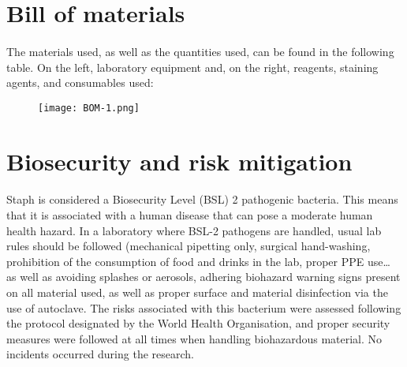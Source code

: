 \section{Bill of materials}
\paragraph{}The materials used, as well as the quantities used, can be found in the following table. On the left, laboratory equipment and, on the right, reagents, staining agents, and consumables used:
\begin{center}\begin{figure}[H]\centering\texttt{[image: BOM-1.png]}\end{figure}\end{center}
\section{Biosecurity and risk mitigation}
\paragraph{}Staph is considered a Biosecurity Level (BSL) 2 pathogenic bacteria\cite{cheungPathogenicityVirulenceStaphylococcus2021}. This means that it is associated with a human disease that can pose a moderate human health hazard. In a laboratory where BSL-2 pathogens are handled, usual lab rules should be followed (mechanical pipetting only, surgical hand-washing, prohibition of the consumption of food and drinks in the lab, proper PPE use… as well as avoiding splashes or aerosols, adhering biohazard warning signs present on all material used, as well as proper surface and material disinfection via the use of autoclave.\newline
The risks associated with this bacterium were assessed following the protocol designated by the World Health Organisation, and proper security measures were followed at all times when handling biohazardous material. No incidents occurred during the research\cite{worldhealthorganizationLaboratoryBiosafetyManual2020}.\newpage